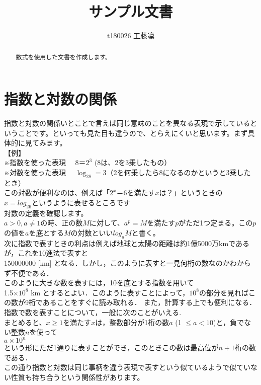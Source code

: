 \documentclass[dvipdfmx,autodetect-engine]{jsarticle}
\title{サンプル文書}
\author{t180026 工藤凜}
\begin{document}
\maketitle

\begin{abstract}
数式を使用した文書を作成します。    
\end{abstract}

\section{指数と対数の関係}
指数と対数の関係いとことで言えば同じ意味のことを異なる表現で示しているということです。といっても見た目も違うので、とらえにくいと思います。まず具体的に見てみます。
\\【例】
\\※指数を使った表現
　$8＝2^3$  (8は、2を3乗したもの）
\\※対数を使った表現
　$\log_28=3$（2を何乗したら8になるのかというと3乗したとき）
\\この対数が便利なのは、例えば「$2^x＝6$を満たす$x$は？」というときの
\\$x=log_26$というように表せるところです
\\対数の定義を確認します。
\\$a>0,a\neq1$の時、正の数$M$に対して、$a^p=M$を満たす$p$がただ1つ定まる。この$p$の値を$a$を底とする$M$の対数といい$log_aM$と書く。
\\次に指数で表すときの利点は例えば地球と太陽の距離は約1億5000万kmであるが，これを10進法で表すと
\\150000000 [km]
となる．しかし，このように表すと一見何桁の数なのかわからず不便である．
\\このように大きな数を表すには，10を底とする指数を用いて
\\1.5×$10^8$ km
とするとよい．このように表すことによって，$10^8$の部分を見ればこの数が9桁であることをすぐに読み取れる． また，計算する上でも便利になる．指数で数を表すことについて，一般に次のことがいえる.
\\まとめると、$x\geq1$を満たす$x$は，整数部分が1桁の数$a$ (1
$ \leq a<10$)と，負でない整数$n$を使って
\\ $a\times 10^n$
\\という形にただ1通りに表すことができ，このときこの数は最高位が$n+1$桁の数である．
\\この通り指数と対数は同じ事柄を違う表現で表すという似ているようで似ていない性質も持ち合うという関係性があります。   
\end{document}
